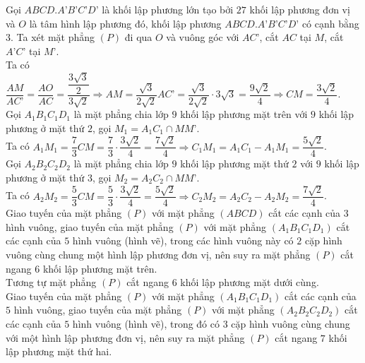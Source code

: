 \begin{ex}
{\begin{center}
		\end{center}		
		Gọi $ABCD.A’B’C’D’$ là khối lập phương lớn tạo bởi $27$ khối lập phương đơn vị và $O$ là tâm hình lập phương đó, khối lập phương $ABCD.A’B’C’D’$ có cạnh bằng $3$. Ta xét mặt phẳng $(P)$ đi qua $O$ và vuông góc với $AC’$, cắt $AC$ tại $M$, cắt $A’C’$ tại $M’$.\\
		Ta có $\dfrac{AM}{AC’}=\dfrac{AO}{AC}=\dfrac{\dfrac{3\sqrt{3}}{2}}{3\sqrt{2}}\Rightarrow AM=\dfrac{\sqrt{3}}{2\sqrt{2}}AC’=\dfrac{\sqrt{3}}{2\sqrt{2}}\cdot 3\sqrt{3}=\dfrac{9\sqrt{2}}{4}\Rightarrow CM=\dfrac{3\sqrt{2}}{4}$.\\
		Gọi $A_1B_1C_1D_1$ là mặt phẳng chia lớp $9$ khối lập phương mặt trên với $9$ khối lập phương ở mặt thứ $2$, gọi $M_1=A_1C_1\cap MM’$.\\
		Ta có $A_1M_1=\dfrac{7}{3}CM=\dfrac{7}{3}\cdot\dfrac{3\sqrt{2}}{4}=\dfrac{7\sqrt{2}}{4}\Rightarrow C_1M_1=A_1C_1-A_1M_1=\dfrac{5\sqrt{2}}{4}$.\\
		Gọi $A_2B_2C_2D_2$ là mặt phẳng chia lớp $9$ khối lập phương mặt thứ $2$ với $9$ khối lập phương ở mặt thứ $3$, gọi $M_2=A_2C_2\cap MM’$.\\
		Ta có $A_2M_2=\dfrac{5}{3}CM=\dfrac{5}{3}\cdot\dfrac{3\sqrt{2}}{4}=\dfrac{5\sqrt{2}}{4}\Rightarrow C_2M_2=A_2C_2-A_2M_2=\dfrac{7\sqrt{2}}{4}$.\\
		Giao tuyến của mặt phẳng $(P)$ với mặt phẳng $(ABCD)$ cắt các cạnh của $3$ hình vuông, giao tuyến của mặt phẳng $(P)$ với mặt phẳng $\left(A_1B_1C_1D_1\right)$ cắt các cạnh của $5$ hình vuông (hình vẽ), trong các hình vuông này có $2$ cặp hình vuông cùng chung một hình lập phương đơn vị, nên suy ra mặt phẳng $(P)$ cắt ngang $6$ khối lập phương mặt trên.\\
		Tương tự mặt phẳng $(P)$ cắt ngang $6$ khối lập phương mặt dưới cùng.\\
		Giao tuyến của mặt phẳng $(P)$ với mặt phẳng $\left(A_1B_1C_1D_1\right)$ cắt các cạnh của $5$ hình vuông, giao tuyến của mặt phẳng $(P)$ với mặt phẳng $\left(A_2B_2C_2D_2\right)$ cắt các cạnh của $5$ hình vuông (hình vẽ), trong đó có 3 cặp hình vuông cùng chung với một hình lập phương đơn vị, nên suy ra mặt phẳng $(P)$ cắt ngang $7$ khối lập phương mặt thứ hai.\\
}
\end{ex}
